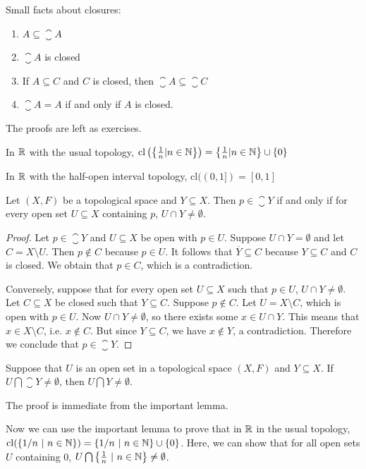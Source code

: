\begin{smallfact}
	Small facts about closures: 
	\begin{enumerate}
		\item $A \subseteq \closure{A}$ 
		\item $\closure{A}$ is closed 
		\item If $A \subseteq C$ and $C$ is closed, then $\closure{A}\subseteq\closure{C}$ 
		\item $\closure{A}=A$ if and only if $A$ is closed. 
	\end{enumerate}
\end{smallfact}
The proofs are left as exercises. 
\begin{example}
	In $\mathbb R$ with the usual topology, $\mathrm{cl}\left(\left\{ \frac{1}{n}|n \in \mathbb N \right\}\right) = \left\{\frac{1}{n}|n \in \mathbb N \right\} \cup \{ 0\}$ 
\end{example}
\begin{example}
	In $\mathbb R$ with the half-open interval topology, $\mathrm{cl}((0,1])=[ 0, 1]$ 
\end{example}
\begin{lemma}
	 Let $(X,F)$ be a topological space and $Y \subseteq X$. Then $ p \in \closure{Y}$ if and only if for every open set $U\subseteq X$ containing $p$, $U \cap Y \neq\emptyset$. 
\end{lemma}
\begin{proof}
	Let $p \in \closure{Y}$ and $U\subseteq X$ be open with $p \in U$. Suppose $U \cap Y = \emptyset$ and let $C=X\setminus U$. Then $p\notin C$ because $p \in U$. It follows that $\overline{Y} \subseteq C$ because $Y \subseteq C$ and $C$ is closed. We obtain that $p \in C$, which is a contradiction.
	
	Conversely, suppose that for every open set $U\subseteq X$ such that $p \in U$, $U\cap Y \neq \emptyset$. Let $C\subseteq X$ be closed such that $Y \subseteq C$. Suppose $p \notin C$. Let $U=X\setminus C$, which is open with $p \in U$. Now $U \cap Y \neq\emptyset$, so there exists some $x \in U \cap Y$. This means that $x\in X\setminus C$, i.e. $x \notin C$. But since $Y \subseteq C$, we have $x \notin Y$, a contradiction. Therefore we conclude that $p \in \closure{Y}$. 
\end{proof}
\begin{corollary}
	Suppose that $U$ is an open set in a topological space $(X,F)$ and $Y \subseteq X$. If $U \bigcap \closure{Y}\neq\emptyset$, then $U \bigcap Y \neq \emptyset$. 
\end{corollary}

\proof The proof is immediate from the important lemma.

Now we can use the important lemma to prove that in $\mathbb R$ in the usual topology, $\mathrm{cl}(\{1/n\ |\ n\in\N\}) = \{1/n\ |\ n\in\N\}\cup\{0\}$. Here, we can show that for all open sets $U$ containing 0, $U \bigcap\left\{ \frac{1}{n}\ |\ n \in \N \right\} \neq \emptyset$. 
